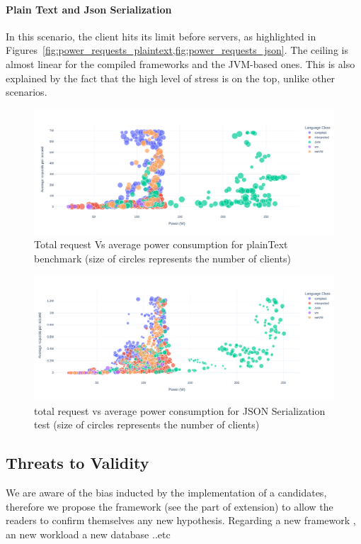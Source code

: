 \paragraph{Plain Text and Json Serialization}
In this scenario, the client hits its limit before servers, as highlighted in Figures~\ref{fig:power_requests_plaintext,fig:power_requests_json}.
The ceiling is almost linear for the compiled frameworks and the JVM-based ones.
This is also explained by the fact that the high level of stress is on the top, unlike other scenarios.

\begin{figure}[hbt]
    \centering
    \includegraphics[width=\textwidth,height=\textheight,keepaspectratio]{imgs/power_requests_plaintext}
    \caption{Total request Vs average power consumption for plainText benchmark (size of circles represents the number of clients)}
    \label{fig:power_requests_plaintext}
\end{figure}

\begin{figure}[hbt]
    \centering
    \includegraphics[width=\textwidth,height=\textheight,keepaspectratio]{imgs/power_requests_json}
    \caption{total request vs average power consumption for JSON Serialization test (size of circles represents the number of clients)}
    \label{fig:power_requests_json}
\end{figure}

\subsection{Threats to Validity}
We are aware of the bias inducted by the implementation of a candidates, therefore we propose the framework (see the part of extension) to allow the readers to confirm themselves any new hypothesis.
Regarding a new framework , an new workload a new database ..etc

